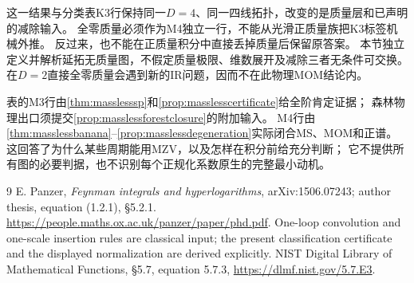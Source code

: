 \documentclass[11pt,a4paper]{ctexart}
\theoremstyle{cnplain}\newtheorem{theorem}{定理}[section]
\theoremstyle{definition}\newtheorem{definition}[theorem]{定义}
\theoremstyle{remark}\newtheorem{remark}[theorem]{注}
\begin{document}
这一结果与分类表K3行保持同一$D=4$、同一四线拓扑，改变的是质量层和已声明的减除输入。
全零质量必须作为M4独立一行，不能从光滑正质量族把K3标签机械外推。
反过来，也不能在正质量积分中直接丢掉质量后保留原答案。
本节独立定义并解析延拓无质量图，不假定质量极限、维数展开及减除三者无条件可交换。
在$D=2$直接全零质量会遇到新的IR问题，因而不在此物理MOM结论内。

表的M3行由\ref{thm:masslesssp}和\ref{prop:masslesscertificate}给全阶肯定证据；
森林物理出口须提交\ref{prop:masslessforestclosure}的附加输入。
M4行由\ref{thm:masslessbanana}--\ref{prop:masslessdegeneration}实际闭合MS、MOM和正谱。
这回答了为什么某些周期能用MZV，以及怎样在积分前给充分判断；
它不提供所有图的必要判据，也不识别每个正规化系数原生的完整最小动机。

\begin{thebibliography}{9}
 E. Panzer, \emph{Feynman integrals and hyperlogarithms},
arXiv:1506.07243; author thesis, equation (1.2.1), \S5.2.1.
\url{https://people.maths.ox.ac.uk/panzer/paper/phd.pdf}.
One-loop convolution and one-scale insertion rules are classical input; the present
classification certificate and the displayed normalization are derived explicitly.
 NIST Digital Library of Mathematical Functions, \S5.7, equation 5.7.3,
\url{https://dlmf.nist.gov/5.7.E3}.
\end{thebibliography}
\end{document}
